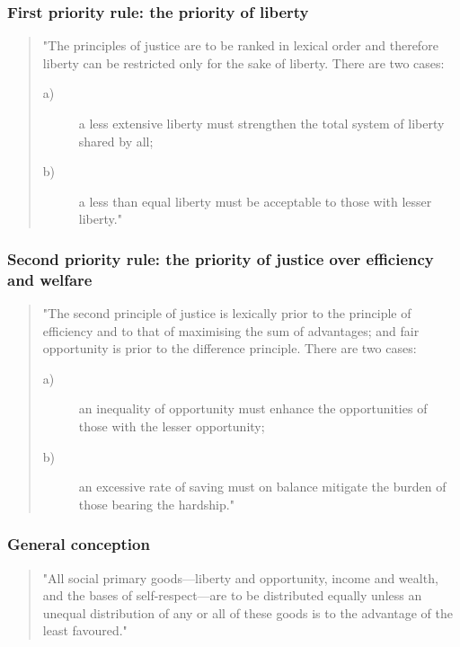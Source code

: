 \documentclass[11pt, oneside]{article}   	%
\begin{document}
\subsubsection{First priority rule: the priority of liberty}

\begin{quote}
"The principles of justice are to be ranked in lexical order and therefore liberty can be restricted only for the sake of liberty.
There are two cases:
\begin{description}
\item[ a)] a less extensive liberty must strengthen the total system of liberty shared by all;
\item[ b)] a less than equal liberty must be acceptable to those with lesser liberty."
\end{description}
\end{quote}

\subsubsection{Second priority rule: the priority of justice over efficiency and welfare}

\begin{quote}
"The second principle of justice is lexically prior to the principle of efficiency and to that of maximising the sum of advantages; and fair opportunity is prior to the difference principle. There are two cases:
\begin{description}
\item[ a)] an inequality of opportunity must enhance the opportunities of those with the lesser opportunity;
\item[ b)] an excessive rate of saving must on balance mitigate the burden of those bearing the hardship."
\end{description}
\end{quote}

\subsubsection{General conception}

\begin{quote}
"All social primary goods---liberty and opportunity, income and wealth, and the bases of self-respect---are to be distributed equally unless an unequal distribution of any or all of these goods is to the advantage of the least favoured."
\end{quote}
\end{document}
